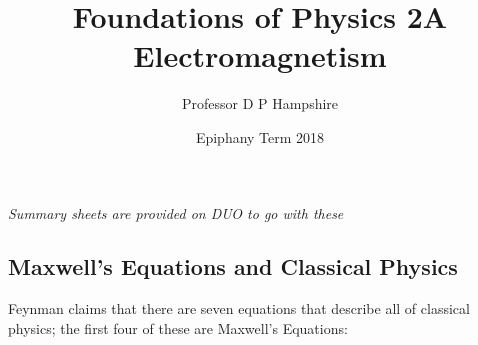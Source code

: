 \documentclass[a4paper, 11pt, normalem]{report}
\title{Foundations of Physics 2A \\ Electromagnetism \vspace{-20pt}}
\author{Professor D P Hampshire}
\date{\vspace{-15pt}Epiphany Term 2018}
\begin{document}
\maketitle
\tableofcontents
{}

\chapter{}

\textit{Summary sheets are provided on DUO to go with these}

\section{Maxwell's Equations and Classical Physics}
Feynman claims that there are seven equations that describe all of classical physics; the first four of these are Maxwell's Equations:
\end{document}
